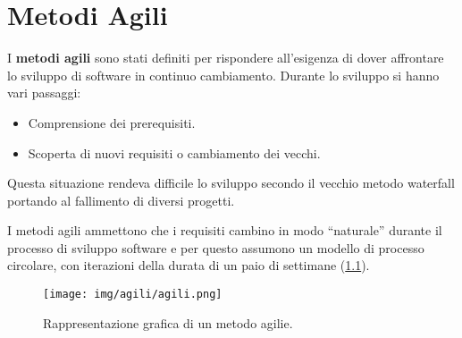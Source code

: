 \chapter{Metodi Agili}
I \textbf{metodi agili} sono stati definiti per rispondere all'esigenza di dover
affrontare lo sviluppo di software in continuo cambiamento. Durante lo sviluppo
si hanno vari passaggi:
\begin{itemize}
    \item Comprensione dei prerequisiti.
    \item Scoperta di nuovi requisiti o cambiamento dei vecchi.
\end{itemize}

Questa situazione rendeva difficile lo sviluppo secondo il vecchio metodo
waterfall portando al fallimento di diversi progetti.

I metodi agili ammettono che i requisiti cambino in modo “naturale” durante il
processo di sviluppo software e per questo assumono un modello di processo
circolare, con iterazioni della durata di un paio di settimane (\ref{fig:agili}).

\begin{figure}[!ht]
    \centering
    \texttt{[image: img/agili/agili.png]}
    \caption{Rappresentazione grafica di un metodo agilie.}
    \label{fig:agili}
\end{figure}

